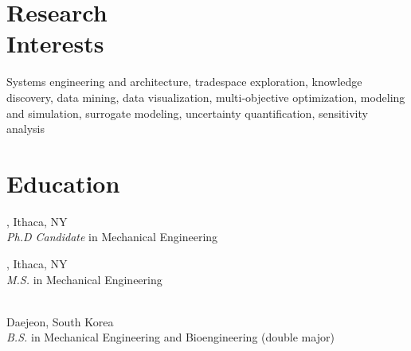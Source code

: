 \documentclass[mm]{simple_style}
\begin{document}
\address{2250 N. Triphammer Rd. Apt \#R1A \\ Ithaca, NY 14850}


\begin{resume}

\section{Research\\Interests}
\par

Systems engineering and architecture, tradespace exploration, knowledge discovery, data mining, data visualization, multi-objective optimization, modeling and simulation, surrogate modeling, uncertainty quantification, sensitivity analysis

\sectionline

\section{Education}
, Ithaca, NY 
\\
{\sl Ph.D Candidate} in Mechanical Engineering\\

, Ithaca, NY 
\\
{\sl M.S.} in Mechanical Engineering\\

\\
Daejeon, South Korea 
\\
{\sl B.S.} in Mechanical Engineering and Bioengineering (double major)


\end{resume}
\end{document}

